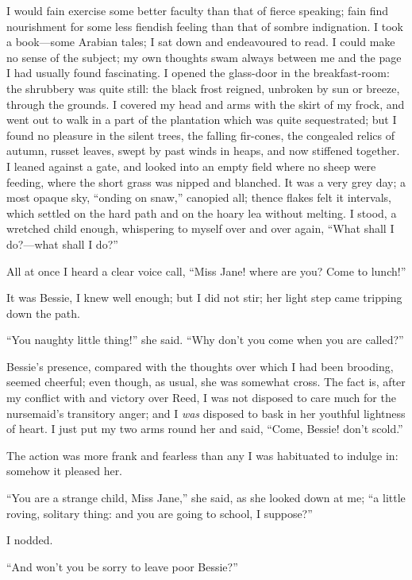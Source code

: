 I would fain exercise some better faculty than that of fierce speaking;
fain find nourishment for some less fiendish feeling than that of sombre
indignation. I took a book---some Arabian tales; I sat down and
endeavoured to read. I could make no sense of the subject; my own
thoughts swam always between me and the page I had usually found
fascinating. I opened the glass-door in the breakfast-room: the
shrubbery was quite still: the black frost reigned, unbroken by sun or
breeze, through the grounds. I covered my head and arms with the skirt
of my frock, and went out to walk in a part of the plantation which was
quite sequestrated; but I found no pleasure in the silent trees, the
falling fir-cones, the congealed relics of autumn, russet leaves, swept
by past winds in heaps, and now stiffened together. I leaned against a
gate, and looked into an empty field where no sheep were feeding, where
the short grass was nipped and blanched. It was a very grey day; a most
opaque sky, \enquote{onding on snaw,} canopied all; thence flakes felt
it intervals, which settled on the hard path and on the hoary lea
without melting. I stood, a wretched child enough, whispering to myself
over and over again, \enquote{What shall I do?---what shall I do?}

All at once I heard a clear voice call, \enquote{Miss Jane! where are
	you? Come to lunch!}

It was Bessie, I knew well enough; but I did not stir; her light step
came tripping down the path.

\enquote{You naughty little thing!} she said. \enquote{Why don't you
	come when you are called?}

Bessie's presence, compared with the thoughts over which I had been
brooding, seemed cheerful; even though, as usual, she was somewhat
cross. The fact is, after my conflict with and victory over \Mrs{} Reed,
I was not disposed to care much for the nursemaid's transitory anger;
and I \emph{was} disposed to bask in her youthful lightness of heart. I
just put my two arms round her and said, \enquote{Come, Bessie! don't
	scold.}

The action was more frank and fearless than any I was habituated to
indulge in: somehow it pleased her.

\enquote{You are a strange child, Miss Jane,} she said, as she looked
down at me; \enquote{a little roving, solitary thing: and you are going
	to school, I suppose?}

I nodded.

\enquote{And won't you be sorry to leave poor Bessie?}

